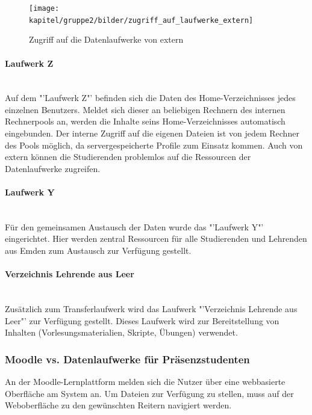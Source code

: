 \begin{figure}[h!]
	\centering
	\texttt{[image: kapitel/gruppe2/bilder/zugriff\_auf\_laufwerke\_extern]}
	\caption{Zugriff auf die Datenlaufwerke von extern \protect\footnotemark}
	\label{fig_zugriff_datenlaufwerke_extern}
\end{figure}


\paragraph{Laufwerk Z}\mbox{} \\

Auf dem "'Laufwerk Z"' befinden sich die Daten des Home-Verzeichnisses jedes einzelnen Benutzers. Meldet sich dieser an beliebigen Rechnern des internen Rechnerpools an, werden die Inhalte seins Home-Verzeichnisses automatisch eingebunden. Der interne Zugriff auf die eigenen Dateien ist von jedem Rechner des Pools möglich, da servergespeicherte Profile zum Einsatz kommen. Auch von extern können die Studierenden problemlos auf die Ressourcen der Datenlaufwerke zugreifen.

\paragraph{Laufwerk Y}\mbox{} \\

Für den gemeinsamen Austausch der Daten wurde das "'Laufwerk Y"' eingerichtet. Hier werden zentral Ressourcen für alle Studierenden und Lehrenden aus Emden zum Austausch zur Verfügung gestellt.

\paragraph{Verzeichnis Lehrende aus Leer}\mbox{} \\

Zusätzlich zum Transferlaufwerk wird das Laufwerk "'Verzeichnis Lehrende aus Leer"' zur Verfügung gestellt. Dieses Laufwerk wird zur Bereitstellung von Inhalten (Vorlesungsmaterialien, Skripte, Übungen) verwendet.

\subsubsection{Moodle vs. Datenlaufwerke für Präsenzstudenten}
An der Moodle-Lernplattform melden sich die Nutzer über eine webbasierte Oberfläche am System an. Um Dateien zur Verfügung zu stellen, muss auf der Weboberfläche zu den gewünschten Reitern navigiert werden.

